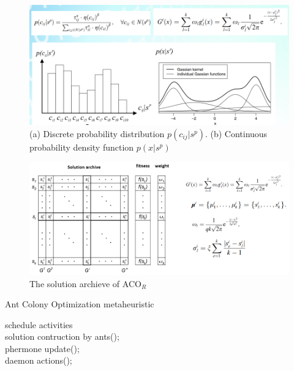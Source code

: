 \begin{figure}
\centering
\includegraphics[width=\textwidth]{ACOR_gaussianKernel}
\caption{(a) Discrete probability distribution $p(c_{ij}|s^{p})$. (b) Continuous probability density function $p(x|s^{p})$}\label{fig:ACOR_gaussianKernel}
\end{figure}

\begin{figure}
\centering
\includegraphics[width=\textwidth]{ACOR_solution_archive}
\caption{The solution archieve of ACO$_R$}\label{fig:ACOR_solution_archive}
\end{figure}

\begin{algorithm}%
\caption{Ant Colony Optimization metaheuristic}\label{algo:ACO}
 {

    schedule activities \\
    solution contruction by ants(); \\
    phermone update(); \\
    daemon actions(); \\
}
\end{algorithm}



